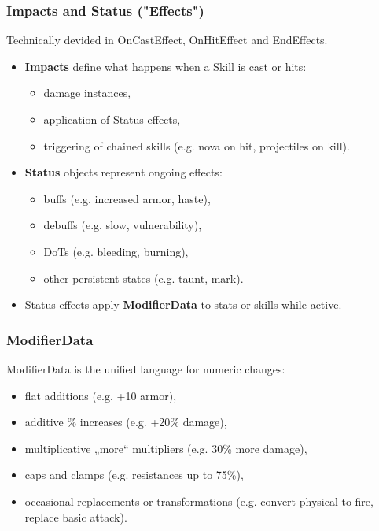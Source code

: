 \subsubsection*{Impacts and Status ("Effects")}

Technically devided in OnCastEffect, OnHitEffect and EndEffects.

\begin{itemize}
	\item \textbf{Impacts} define what happens when a Skill is cast or hits:
	\begin{itemize}
		\item damage instances,
		\item application of Status effects,
		\item triggering of chained skills (e.g. nova on hit, projectiles on kill).
	\end{itemize}
	\item \textbf{Status} objects represent ongoing effects:
	\begin{itemize}
		\item buffs (e.g. increased armor, haste),
		\item debuffs (e.g. slow, vulnerability),
		\item DoTs (e.g. bleeding, burning),
		\item other persistent states (e.g. taunt, mark).
	\end{itemize}
	\item Status effects apply \textbf{ModifierData} to stats or skills while active.
\end{itemize}

\subsubsection*{ModifierData}

ModifierData is the unified language for numeric changes:

\begin{itemize}
	\item flat additions (e.g. +10 armor),
	\item additive \% increases (e.g. +20\% damage),
	\item multiplicative „more“ multipliers (e.g. 30\% more damage),
	\item caps and clamps (e.g. resistances up to 75\%),
	\item occasional replacements or transformations (e.g. convert physical to fire, replace basic attack).
\end{itemize}

